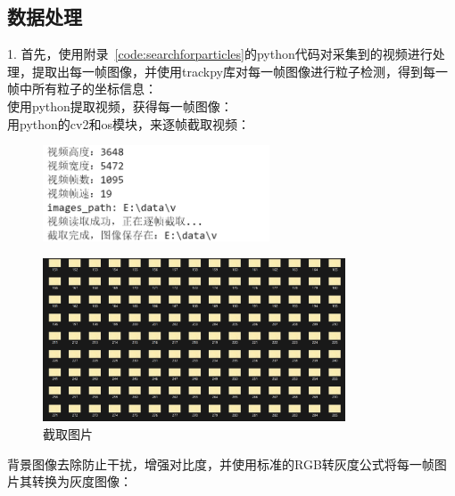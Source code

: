 \documentclass[a4paper]{report} %
\begin{document}
\subsection{数据处理}
1. 首先，使用附录~\ref{code:searchforparticles}的python代码对采集到的视频进行处理，提取出每一帧图像，并使用trackpy库对每一帧图像进行粒子检测，得到每一帧中所有粒子的坐标信息：\\
使用python提取视频，获得每一帧图像：\\
用python的cv2和os模块，来逐帧截取视频：
\begin{figure}[H]
    \includegraphics[width=0.6\textwidth]{说明.png}
\end{figure} 
\begin{figure}[H]
    \centering
    \includegraphics[width=0.8\textwidth]{图片.png}
    \caption{截取图片}
\end{figure} 
背景图像去除防止干扰，增强对比度，并使用标准的RGB转灰度公式将每一帧图片其转换为灰度图像：\\
\end{document}
